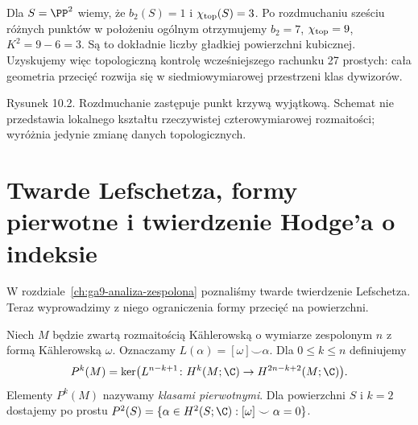\begin{przyklad}
Dla $S=\PP^2$ wiemy, że $b_2(S)=1$ i
$\chi_{\rm top}(S)=3$. Po rozdmuchaniu sześciu
różnych punktów w położeniu ogólnym otrzymujemy
$b_2=7$, $\chi_{\rm top}=9$, $K^2=9-6=3$.
Są to dokładnie liczby gładkiej powierzchni kubicznej.
Uzyskujemy więc topologiczną kontrolę wcześniejszego
rachunku 27 prostych: cała geometria przecięć rozwija się
w siedmiowymiarowej przestrzeni klas dywizorów.
\end{przyklad}

\begin{center}

{\small Rysunek 10.2. Rozdmuchanie zastępuje punkt krzywą wyjątkową.
Schemat nie przedstawia lokalnego kształtu rzeczywistej czterowymiarowej
rozmaitości; wyróżnia jedynie zmianę danych topologicznych.}\par
\end{center}

\section{Twarde Lefschetza, formy pierwotne i twierdzenie Hodge'a o indeksie}
\label{sec:ga10-hard-index}

W rozdziale~\ref{ch:ga9-analiza-zespolona} poznaliśmy
twarde twierdzenie Lefschetza. Teraz wyprowadzimy z niego
ograniczenia formy przecięć na powierzchni.

\begin{definicja}
Niech $M$ będzie zwartą rozmaitością Kählerowską
o wymiarze zespolonym $n$ z formą Kählerowską $\omega$.
Oznaczamy $L(\alpha)=[\omega]\smile\alpha$.
Dla $0\le k\le n$ definiujemy
\[
 P^k(M)=\ker\bigl(L^{n-k+1}\colon
 H^k(M;\C)\to H^{2n-k+2}(M;\C)\bigr).
\]
Elementy $P^k(M)$ nazywamy \emph{klasami pierwotnymi}.
Dla powierzchni $S$ i $k=2$ dostajemy po prostu
$P^2(S)=\{\alpha\in H^2(S;\C):[\omega]\smile\alpha=0\}$.
\end{definicja}

